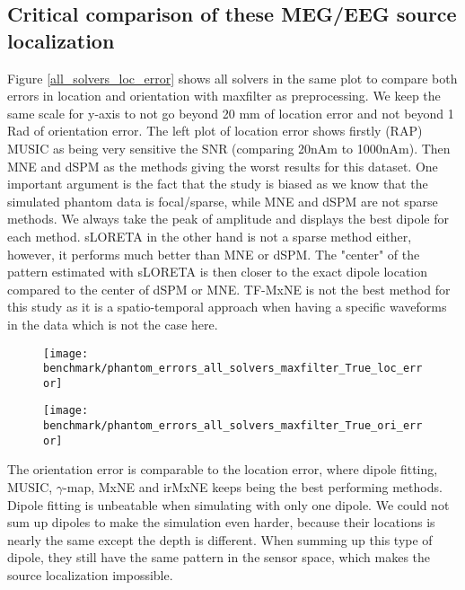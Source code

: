 \subsection{Critical comparison of these MEG/EEG source localization}
Figure \ref{all_solvers_loc_error} shows all solvers in the same plot to compare both errors in location and orientation with maxfilter as preprocessing. We keep the same scale for y-axis to not go beyond 20 mm of location error and not beyond 1 Rad of orientation error. The left plot of location error shows firstly (RAP) MUSIC as being very sensitive the SNR (comparing 20nAm to 1000nAm). Then MNE and dSPM as the methods giving the worst results for this dataset. One important argument is the fact that the study is biased as we know that the simulated phantom data is focal/sparse, while MNE and dSPM are not sparse methods. We always take the peak of amplitude and displays the best dipole for each method. sLORETA in the other hand is not a sparse method either, however, it performs much better than MNE or dSPM. The "center" of the pattern estimated with sLORETA is then closer to the exact dipole location compared to the center of dSPM or MNE. TF-MxNE is not the best method for this study as it is a spatio-temporal approach when having a specific waveforms in the data which is not the case here.

\begin{sidewaysfigure}[ht]
        \centering
        \begin{subfigure}[b]{0.47\textwidth}
            \centering
            \texttt{[image: benchmark/phantom\_errors\_all\_solvers\_maxfilter\_True\_loc\_error]}
            \caption{\label{fig:all_solvers_loc_error}}
        \end{subfigure}
		\hspace{25pt}
        \begin{subfigure}[b]{0.47\textwidth}  
            \centering 
            \texttt{[image: benchmark/phantom\_errors\_all\_solvers\_maxfilter\_True\_ori\_error]}
            \caption{\label{fig:all_solvers_ori_error}}
        \end{subfigure}

		\caption{Comparison of the position and the orientation error between most of the solvers for 4 different dipoles.\label{all_solvers_loc_error}}
\end{sidewaysfigure}

The orientation error is comparable to the location error, where dipole fitting, MUSIC, $\gamma$-map, MxNE and irMxNE keeps being the best performing methods. Dipole fitting is unbeatable when simulating with only one dipole. We could not sum up dipoles to make the simulation even harder, because their locations is nearly the same except the depth is different. When summing up this type of dipole, they still have the same pattern in the sensor space, which makes the source localization impossible.

